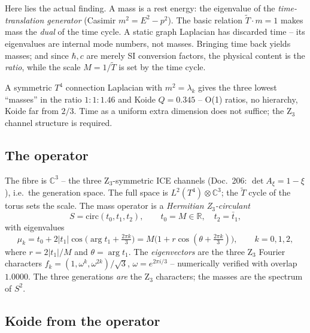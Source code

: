 Here lies the actual finding. A mass is a rest energy: the eigenvalue of the
\emph{time-translation generator} (Casimir $m^2=E^2-p^2$). The basic relation
$\tilde T\cdot m=1$ makes mass the \emph{dual} of the time cycle. A static graph
Laplacian has discarded time -- its eigenvalues are internal mode numbers, not
masses. Bringing time back yields masses; and since $\hbar,c$ are merely SI
conversion factors, the physical content is the \emph{ratio}, while the scale
$M=1/\tilde T$ is set by the time cycle.

\begin{warningboxenv}
A symmetric $T^4$ connection Laplacian with $m^2=\lambda_k$ gives the three
lowest \enquote{masses} in the ratio $1{:}1{:}1.46$ and Koide $Q=0.345$ --
O(1) ratios, no hierarchy, Koide far from $2/3$. Time as a uniform extra
dimension does not suffice; the Z$_3$ channel structure is required.
\end{warningboxenv}

\subsection{The operator}

The fibre is $\mathbb{C}^3$ -- the three Z$_3$-symmetric ICE channels (Doc.~206:
$\det A_\xi=1-\xi$), i.e.\ the generation space. The full space is
$L^2(T^4)\otimes\mathbb{C}^3$; the $\tilde T$ cycle of the torus sets the scale.
The mass operator is a \emph{Hermitian Z$_3$-circulant}
\begin{equation}
  S=\mathrm{circ}(t_0,t_1,t_2),\qquad t_0=M\in\mathbb{R},\quad t_2=\bar t_1,
\end{equation}
with eigenvalues
\begin{equation}
  \mu_k = t_0 + 2|t_1|\cos\!\bigl(\arg t_1 + \tfrac{2\pi k}{3}\bigr)
        = M\bigl(1 + r\cos(\theta + \tfrac{2\pi k}{3})\bigr),
  \qquad k=0,1,2,
\end{equation}
where $r=2|t_1|/M$ and $\theta=\arg t_1$. The \emph{eigenvectors} are the three
Z$_3$ Fourier characters $f_k=(1,\omega^k,\omega^{2k})/\sqrt3$,
$\omega=e^{2\pi i/3}$ -- numerically verified with overlap $1.0000$. The three
generations \emph{are} the Z$_3$ characters; the masses are the spectrum of
$S^2$.

\subsection{Koide from the operator}

